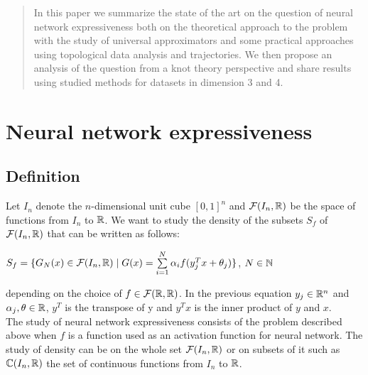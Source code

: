 \documentclass[12pt]{article}
\begin{document}
\newpage
\maketitle
\begin{abstract}
  In this paper we summarize the state of the art on the question of neural network expressiveness both on the theoretical approach to the problem with the study of universal approximators and some practical approaches using topological data analysis and trajectories. We then propose an analysis of the question from a knot theory perspective and share results using studied methods for datasets in dimension 3 and 4.
\end{abstract}

\newpage

\tableofcontents

\newpage

\section{Neural network expressiveness}

\subsection{Definition}

Let $I_n$ denote the $n$-dimensional unit cube $[0,1]^n$ and $\mathcal{F}(I_n,\mathbb{R})$ be the space of functions from $I_n$ to $\mathbb{R}$. We want to study the density of the subsets $S_f$ of $\mathcal{F}(I_n,\mathbb{R})$ that can be written as follows:\\

\begin{center}
  $S_f = \{G_N(x) \in \mathcal{F}(I_n,\mathbb{R}) \mid G(x) = \sum\limits_{i=1}^{N} \alpha_i f(y_j^T x + \theta_j )\}$, $N \in \mathbb{N} $
\end{center}

depending on the choice of $f \in \mathcal{F}(\mathbb{R},\mathbb{R})$. In the previous equation $y_j \in \mathbb{R}^n$ and $\alpha_j, \theta \in \mathbb{R}$, $y^T$ is the transpose of y and $y^Tx$ is the inner product of $y$ and $x$.\\

The study of neural network expressiveness consists of the problem described above when $f$ is a function used as an activation function for neural network. The study of density can be on the whole set $\mathcal{F}(I_n,\mathbb{R})$ or on subsets of it such as $\mathbb{C}(I_n,\mathbb{R})$ the set of continuous functions from $I_n$ to $\mathbb{R}$.\\
\end{document}
